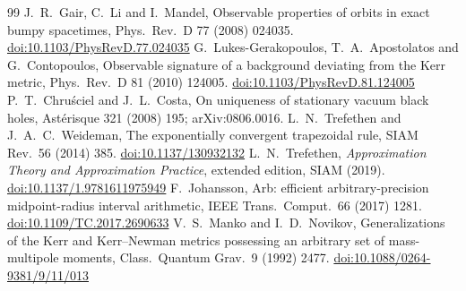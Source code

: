\documentclass[11pt,a4paper]{article}
\begin{document}
\begin{thebibliography}{99}
 J.~R.~Gair, C.~Li and I.~Mandel, Observable properties of orbits in exact bumpy
spacetimes, Phys.\ Rev.\ D 77 (2008) 024035. \href{https://doi.org/10.1103/PhysRevD.77.024035}{doi:10.1103/PhysRevD.77.024035}
 G.~Lukes-Gerakopoulos, T.~A.~Apostolatos and G.~Contopoulos, Observable signature of
a background deviating from the Kerr metric, Phys.\ Rev.\ D 81 (2010) 124005.
\href{https://doi.org/10.1103/PhysRevD.81.124005}{doi:10.1103/PhysRevD.81.124005}
 P.~T.~Chru\'sciel and J.~L.~Costa, On uniqueness of stationary vacuum black holes,
Ast\'erisque 321 (2008) 195; arXiv:0806.0016.
 L.~N.~Trefethen and J.~A.~C.~Weideman, The exponentially convergent trapezoidal rule,
SIAM Rev.\ 56 (2014) 385. \href{https://doi.org/10.1137/130932132}{doi:10.1137/130932132}
 L.~N.~Trefethen, \emph{Approximation Theory and Approximation Practice}, extended edition, SIAM (2019).
\href{https://doi.org/10.1137/1.9781611975949}{doi:10.1137/1.9781611975949}
 F.~Johansson, Arb: efficient arbitrary-precision midpoint-radius interval arithmetic, IEEE Trans.\
Comput.\ 66 (2017) 1281. \href{https://doi.org/10.1109/TC.2017.2690633}{doi:10.1109/TC.2017.2690633}
\bibitem{MankoNovikov1992} V.~S.~Manko and I.~D.~Novikov, Generalizations of the Kerr and Kerr--Newman metrics
possessing an arbitrary set of mass-multipole moments, Class.\ Quantum Grav.\ 9 (1992) 2477.
\href{https://doi.org/10.1088/0264-9381/9/11/013}{doi:10.1088/0264-9381/9/11/013}
\end{thebibliography}
\end{document}
